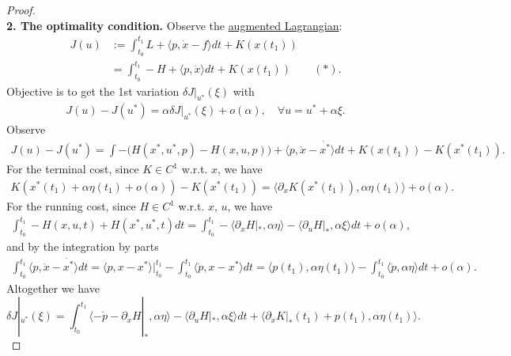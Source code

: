 \documentclass[a4paper,11pt,fleqn]{book}
\theoremstyle{definition}
\theoremstyle{remark}
\begin{document}
\begin{proof}
\quad\\
\textbf{2. The optimality condition. }
Observe the \underline{augmented Lagrangian}:
\begin{equation}
\begin{aligned}
	J(u)&:= \int_{t_0}^{t_1} L +  \langle p , \dot{x} - f \rangle  dt + K(x(t_1)) \\
	&= \int_{t_0}^{t_1} - H + \langle p, \dot{x} \rangle dt + K(x(t_1)) \qquad(*).
	\end{aligned}
\end{equation}
Objective is to get the 1st variation $\delta J|_{u^*}(\xi)$ with
\begin{align*}
	J(u) - J(u^*) = \alpha \delta J|_{u^*}(\xi) + o(\alpha), \quad \forall u = u^* + \alpha \xi .
\end{align*}
Observe 
\begin{align*}
	J(u) - J(u^*) = \int -\bigg( H(x^*, u^*, p) - H(x, u, p) \bigg) + \langle p, \dot{x} - \dot{x^*} \rangle dt + K(x(t_1)) - K(x^*(t_1)). 
\end{align*}
For the terminal cost, since $K \in C^1$ w.r.t. $x$, we have
\begin{align*}
	K(x^*(t_1) + \alpha \eta(t_1) + o(\alpha)) - K(x^*(t_1)) = \langle \partial_x K(x^*(t_1)),   \alpha \eta(t_1) \rangle  + o(\alpha).
\end{align*}
For the running cost, since $H \in C^1$ w.r.t. $x$, $u$, we have
\begin{align*}
	\int_{t_0}^{t_1} -H(x, u, t) + H(x^*, u^*, t)dt =  \int_{t_0}^{t_1}-  \langle \partial_xH|_*, \alpha \eta  \rangle - \langle \partial_u H|_*, \alpha \xi  \rangle dt + o(\alpha) ,
\end{align*}
and by the integration by parts
\begin{align*}
	\int_{t_0}^{t_1} \langle p , \dot{x} - \dot{x^*} \rangle dt = \langle p, x - x^* \rangle\bigg|_{t_0}^{t_1} - \int_{t_0}^{t_1} \langle \dot{p}, x - x^* \rangle dt = \langle p(t_1), \alpha \eta(t_1) \rangle - \int_{t_0}^{t_1} \langle \dot{p}, \alpha \eta \rangle dt + o(\alpha). 
\end{align*}
Altogether we have
\begin{equation}
	\delta J|_{u^*}(\xi) = \int_{t_0}^{t_1} \langle -\dot{p} - \partial_x H|_*, \alpha \eta \rangle - \langle \partial_u H|_*, \alpha\xi \rangle dt + \langle \partial_xK|_*(t_1) + p(t_1), \alpha \eta(t_1) \rangle.
\end{equation}
\end{proof}
\end{document}
